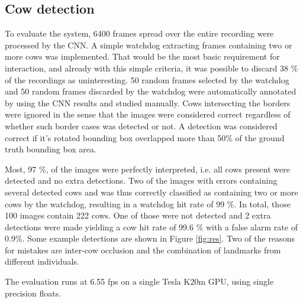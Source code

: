 \documentclass{cta-author}
\begin{document}
\subsection{Cow detection}
\label{sec:num}
To evaluate the system, 6400 frames spread over the entire recording were processed by the CNN. A simple watchdog extracting frames containing two or more cows was implemented. That would be the most basic requirement for interaction, and already with this simple criteria, it was possible to discard 38 \% of the recordings as uninteresting. 50 random frames selected by the watchdog and 50 random frames discarded by the watchdog were automatically annotated by using the CNN results and studied manually. Cows intersecting the borders were ignored in the sense that the images were considered correct regardless of whether such border cases was detected or not. A detection was considered correct if it's rotated bounding box overlapped more than 50\% of the ground truth bounding box area.

Most, 97 \%, of the images were perfectly interpreted, i.e. all cows present were detected and no extra detections. Two of the images with errors containing several detected cows and was thus correctly classified as containing two or more cows by the watchdog, resulting in a watchdog hit rate of 99 \%. In total, those 100 images contain 222 cows. One of those were not detected and 2 extra detections were made yielding a cow hit rate of 99.6 \% with a false alarm rate of 0.9\%. Some example detections are shown in Figure \ref{fig:res}.
Two of the reasons for mistakes are inter-cow occlusion and the combination of landmarks from different individuals.

The evaluation runs at 6.55 fps on a single Tesla K20m GPU, using single precision floats.
\end{document}
